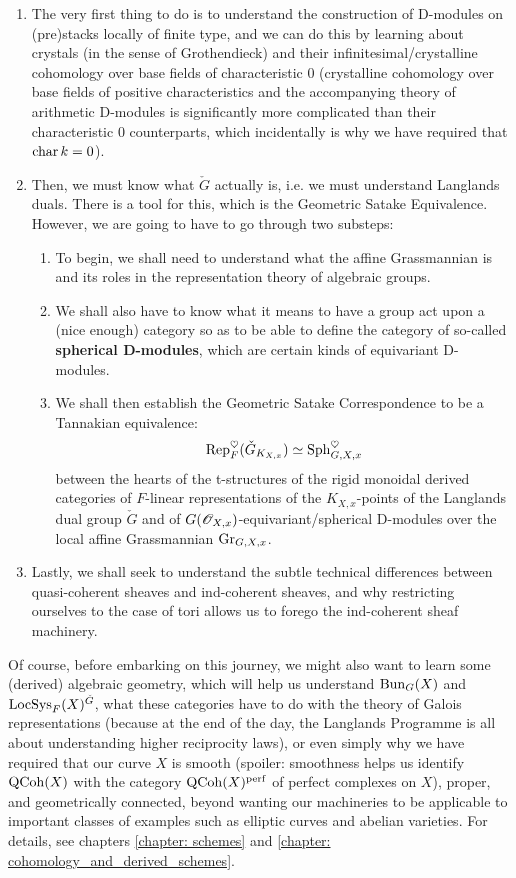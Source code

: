             \begin{enumerate}
                \item The very first thing to do is to understand the construction of D-modules on (pre)stacks locally of finite type, and we can do this by learning about crystals (in the sense of Grothendieck) and their infinitesimal/crystalline cohomology over base fields of characteristic $0$ (crystalline cohomology over base fields of positive characteristics and the accompanying theory of arithmetic D-modules is significantly more complicated than their characteristic $0$ counterparts, which incidentally is why we have required that $\operatorname{char} k = 0$).
                \item Then, we must know what $\check{G}$ actually is, i.e. we must understand Langlands duals. There is a tool for this, which is the Geometric Satake Equivalence. However, we are going to have to go through two substeps:
                    \begin{enumerate}
                        \item To begin, we shall need to understand what the affine Grassmannian is and its roles in the representation theory of algebraic groups.
                        \item We shall also have to know what it means to have a group act upon a (nice enough) category so as to be able to define the category of so-called \textbf{spherical D-modules}, which are certain kinds of equivariant D-modules.
                        \item We shall then establish the Geometric Satake Correspondence to be a Tannakian equivalence:
                            $$\mathrm{Rep}^{\heartsuit}_F(\check{G}_{K_{X, x}}) \simeq \mathrm{Sph}^{\heartsuit}_{G, X, x}$$
                        between the hearts of the t-structures of the rigid monoidal derived categories of $F$-linear representations of the $K_{X, x}$-points of the Langlands dual group $\check{G}$ and of $G(\mathscr{O}_{X, x})$-equivariant/spherical D-modules over the local affine Grassmannian $\mathrm{Gr}_{G, X, x}$.
                    \end{enumerate}
                \item Lastly, we shall seek to understand the subtle technical differences between quasi-coherent sheaves and ind-coherent sheaves, and why restricting ourselves to the case of tori allows us to forego the ind-coherent sheaf machinery. 
            \end{enumerate}
        Of course, before embarking on this journey, we might also want to learn some (derived) algebraic geometry, which will help us understand $\mathrm{Bun}_G(X)$ and $\mathrm{LocSys}_F(X)^{\check{G}}$, what these categories have to do with the theory of Galois representations (because at the end of the day, the Langlands Programme is all about understanding higher reciprocity laws), or even simply why we have required that our curve $X$ is smooth (spoiler: smoothness helps us identify $\mathrm{QCoh}(X)$ with the category $\mathrm{QCoh}(X)^{\mathrm{perf}}$ of perfect complexes on $X$), proper, and geometrically connected, beyond wanting our machineries to be applicable to important classes of examples such as elliptic curves and abelian varieties. For details, see chapters \ref{chapter: schemes} and \ref{chapter: cohomology_and_derived_schemes}.
